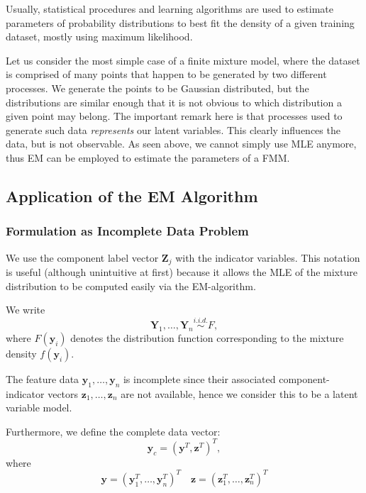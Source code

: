 \documentclass{article}\usepackage[]{graphicx}\usepackage[]{xcolor}
\theoremstyle{plain}
\theoremstyle{definition}
\theoremstyle{remark}
\newcommand{\boldY}{\mathbf{Y}}
\newcommand{\boldZ}{\mathbf{Z}}
\newcommand{\boldz}{\mathbf{z}}
\newcommand{\boldy}{\mathbf{y}}
\begin{document}
Usually, statistical procedures and learning algorithms are used to estimate parameters of probability distributions to best fit the density of a given training dataset, mostly using maximum likelihood.

Let us consider the most simple case of a finite mixture model, where the dataset is comprised of many points that happen to be generated by two different processes. We generate the points to be Gaussian distributed, but the distributions are similar enough that it is not obvious to which distribution a given point may belong. The important remark here is that processes used to generate such data \textit{represents} our latent variables. This clearly influences the data, but is not observable. As seen above, we cannot simply use MLE anymore, thus EM can be employed to estimate the parameters of a FMM.

\subsection{Application of the EM Algorithm}

\subsubsection{Formulation as Incomplete Data Problem} \label{subsec:incomplete}

We use the component label vector $\boldZ_j$ with the indicator variables. This notation is useful (although unintuitive at first) because it allows the MLE of the mixture distribution to be computed easily via the EM-algorithm. 

We write
\begin{equation*}
    \boldY_1, \dots, \boldY_n   \stackrel{i.i.d.}{\sim} F,
\end{equation*}
where $F(\boldy_i)$ denotes the distribution function corresponding to the mixture density $f(\boldy_i)$.

The feature data $\boldy_1, \dots, \boldy_n$ is incomplete since their associated component-indicator vectors $\boldz_1, \dots, \boldz_n$ are not available, hence we consider this to be a latent variable model.

Furthermore, we define the complete data vector:
\begin{equation} \label{eq:ycomplete}
    \boldy_c = (\boldy^T, \boldz^T)^T,
\end{equation}
where
\begin{equation*}
    \boldy = (\boldy_1^T, \dots, \boldy_n^T)^T \quad \boldz = (\boldz_1^T, \dots, \boldz_n^T)^T
\end{equation*}
\end{document}
